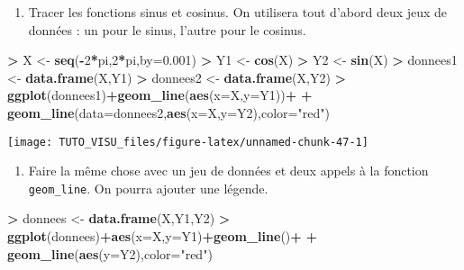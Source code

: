 \documentclass[]{article}
\newenvironment{Shaded}{\begin{snugshade}}{\end{snugshade}}
\newcommand{\DataTypeTok}[1]{\textcolor[rgb]{0.13,0.29,0.53}{#1}}
\newcommand{\DecValTok}[1]{\textcolor[rgb]{0.00,0.00,0.81}{#1}}
\newcommand{\FloatTok}[1]{\textcolor[rgb]{0.00,0.00,0.81}{#1}}
\newcommand{\KeywordTok}[1]{\textcolor[rgb]{0.13,0.29,0.53}{\textbf{#1}}}
\newcommand{\NormalTok}[1]{#1}
\newcommand{\OperatorTok}[1]{\textcolor[rgb]{0.81,0.36,0.00}{\textbf{#1}}}
\newcommand{\StringTok}[1]{\textcolor[rgb]{0.31,0.60,0.02}{#1}}
\providecommand{\tightlist}{%
  \setlength{\itemsep}{0pt}\setlength{\parskip}{0pt}}
\theoremstyle{definition}
\theoremstyle{definition}
\theoremstyle{definition}
\theoremstyle{remark}
\begin{document}
\begin{enumerate}
\def\labelenumi{\arabic{enumi}.}
\tightlist
\item
  Tracer les fonctions sinus et cosinus. On utilisera tout d'abord deux jeux de données : un pour le sinus, l'autre pour le cosinus.
\end{enumerate}

\begin{Shaded}
\begin{Highlighting}[]
\OperatorTok{>}\StringTok{ }\NormalTok{X <-}\StringTok{ }\KeywordTok{seq}\NormalTok{(}\OperatorTok{-}\DecValTok{2}\OperatorTok{*}\NormalTok{pi,}\DecValTok{2}\OperatorTok{*}\NormalTok{pi,}\DataTypeTok{by=}\FloatTok{0.001}\NormalTok{)}
\OperatorTok{>}\StringTok{ }\NormalTok{Y1 <-}\StringTok{ }\KeywordTok{cos}\NormalTok{(X)}
\OperatorTok{>}\StringTok{ }\NormalTok{Y2 <-}\StringTok{ }\KeywordTok{sin}\NormalTok{(X)}
\OperatorTok{>}\StringTok{ }\NormalTok{donnees1 <-}\StringTok{ }\KeywordTok{data.frame}\NormalTok{(X,Y1)}
\OperatorTok{>}\StringTok{ }\NormalTok{donnees2 <-}\StringTok{ }\KeywordTok{data.frame}\NormalTok{(X,Y2)}
\OperatorTok{>}\StringTok{ }\KeywordTok{ggplot}\NormalTok{(donnees1)}\OperatorTok{+}\KeywordTok{geom_line}\NormalTok{(}\KeywordTok{aes}\NormalTok{(}\DataTypeTok{x=}\NormalTok{X,}\DataTypeTok{y=}\NormalTok{Y1))}\OperatorTok{+}
\OperatorTok{+}\StringTok{   }\KeywordTok{geom_line}\NormalTok{(}\DataTypeTok{data=}\NormalTok{donnees2,}\KeywordTok{aes}\NormalTok{(}\DataTypeTok{x=}\NormalTok{X,}\DataTypeTok{y=}\NormalTok{Y2),}\DataTypeTok{color=}\StringTok{"red"}\NormalTok{)}
\end{Highlighting}
\end{Shaded}

\begin{center}\texttt{[image: TUTO\_VISU\_files/figure-latex/unnamed-chunk-47-1]} \end{center}

\begin{enumerate}
\def\labelenumi{\arabic{enumi}.}
\setcounter{enumi}{1}
\tightlist
\item
  Faire la même chose avec un jeu de données et deux appels à la fonction \texttt{geom\_line}. On pourra ajouter une légende.
\end{enumerate}

\begin{Shaded}
\begin{Highlighting}[]
\OperatorTok{>}\StringTok{ }\NormalTok{donnees <-}\StringTok{ }\KeywordTok{data.frame}\NormalTok{(X,Y1,Y2)}
\OperatorTok{>}\StringTok{ }\KeywordTok{ggplot}\NormalTok{(donnees)}\OperatorTok{+}\KeywordTok{aes}\NormalTok{(}\DataTypeTok{x=}\NormalTok{X,}\DataTypeTok{y=}\NormalTok{Y1)}\OperatorTok{+}\KeywordTok{geom_line}\NormalTok{()}\OperatorTok{+}
\OperatorTok{+}\StringTok{   }\KeywordTok{geom_line}\NormalTok{(}\KeywordTok{aes}\NormalTok{(}\DataTypeTok{y=}\NormalTok{Y2),}\DataTypeTok{color=}\StringTok{"red"}\NormalTok{)}
\end{Highlighting}
\end{Shaded}
\end{document}
